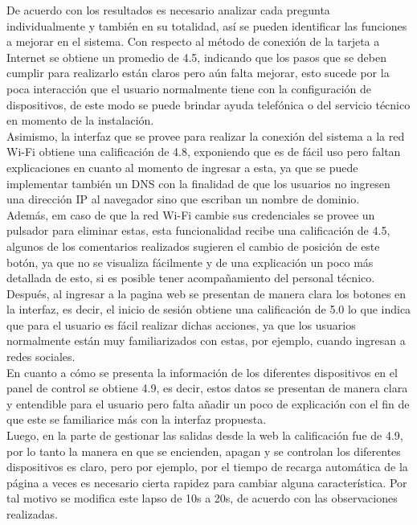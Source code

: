 De acuerdo con los resultados es necesario analizar cada pregunta individualmente y también en su totalidad, así se pueden identificar las funciones a mejorar en el sistema. Con respecto al método de conexión de la tarjeta a Internet se obtiene un promedio de 4.5, indicando que los pasos que se deben cumplir para realizarlo están claros pero aún falta mejorar, esto sucede por la poca interacción que el usuario normalmente tiene con la configuración de dispositivos, de este modo se puede brindar ayuda telefónica o del servicio técnico en momento de la instalación.\\

Asimismo, la interfaz que se provee para realizar la conexión del sistema a la red Wi-Fi obtiene una calificación de 4.8, exponiendo que es de fácil uso pero faltan explicaciones en cuanto al momento de ingresar a esta, ya que se puede implementar también un DNS con la finalidad de que los usuarios no ingresen una dirección IP al navegador sino que escriban un nombre de dominio.\\

Además, em caso de que la red Wi-Fi cambie sus credenciales se provee un pulsador para eliminar estas, esta funcionalidad recibe una calificación de 4.5, algunos de los comentarios realizados sugieren el cambio de posición de este botón, ya que no se visualiza fácilmente y de una explicación un poco más detallada de esto, si es posible tener acompañamiento del personal técnico.\\

Después, al ingresar a la pagina web se presentan de manera clara los botones en la interfaz, es decir, el inicio de sesión obtiene una calificación de 5.0 lo que indica que para el usuario es fácil realizar dichas acciones, ya que los usuarios normalmente están muy familiarizados con estas, por ejemplo, cuando ingresan a redes sociales.\\

En cuanto a cómo se presenta la información de los diferentes dispositivos en el panel de control se obtiene 4.9, es decir, estos datos se presentan de manera clara y entendible para el usuario pero falta añadir un poco de explicación con el fin de que este se familiarice más con la interfaz propuesta.\\

Luego, en la parte de gestionar las salidas desde la web la calificación fue de 4.9, por lo tanto la manera en que se encienden, apagan y se controlan los diferentes dispositivos es claro, pero por ejemplo, por el tiempo de recarga automática de la página a veces es necesario cierta rapidez para cambiar alguna característica. Por tal motivo se modifica este lapso de 10s a 20s, de acuerdo con las observaciones realizadas.\\

